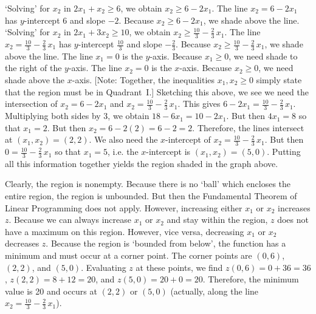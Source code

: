 \documentclass[11pt,letterpaper]{article}
\begin{document}
\sol `Solving' for $x_2$ in $2x_1 + x_2 \geq 6$, we obtain $x_2 \geq 6 - 2x_1$. The line $x_2= 6 - 2x_1$ has $y$-intercept 6 and slope $-2$. Because $x_2 \geq 6 - 2x_1$, we shade above the line. `Solving' for $x_2$ in $2x_1 + 3x_2 \geq 10$, we obtain $x_2 \geq \frac{10}{3} - \frac{2}{3}\,x_1$. The line $x_2= \frac{10}{3} - \frac{2}{3}\,x_1$ has $y$-intercept $\frac{10}{3}$ and slope $-\frac{2}{3}$. Because $x_2 \geq \frac{10}{3} - \frac{2}{3}\,x_1$, we shade above the line. The line $x_1= 0$ is the $y$-axis. Because $x_1 \geq 0$, we need shade to the right of the $y$-axis. The line $x_2= 0$ is the $x$-axis. Because $x_2 \geq 0$, we need shade above the $x$-axis. [Note: Together, the inequalities $x_1, x_2 \geq 0$ simply state that the region must be in Quadrant~I.] Sketching this above, we see we need the intersection of $x_2= 6 - 2x_1$ and $x_2= \frac{10}{3} - \frac{2}{3}\,x_1$. This gives $6 - 2x_1= \frac{10}{3} - \frac{2}{3}\,x_1$. Multiplying both sides by 3, we obtain $18 - 6x_1= 10 - 2x_1$. But then $4x_1= 8$ so that $x_1= 2$. But then $x_2= 6 - 2(2)= 6 - 2= 2$. Therefore, the lines intersect at $(x_1, x_2)= (2, 2)$. We also need the $x$-intercept of $x_2= \frac{10}{3} - \frac{2}{3}\,x_1$. But then $0= \frac{10}{3} - \frac{2}{3}\,x_1$ so that $x_1= 5$, i.e. the $x$-intercept is $(x_1, x_2)= (5, 0)$. Putting all this information together yields the region shaded in the graph above. \pspace

Clearly, the region is nonempty. Because there is no `ball' which encloses the entire region, the region is unbounded. But then the Fundamental Theorem of Linear Programming does not apply. However, increasing either $x_1$ or $x_2$ increases $z$. Because we can always increase $x_1$ or $x_2$ and stay within the region, $z$ does not have a maximum on this region. However, vice versa, decreasing $x_1$ or $x_2$ decreases $z$. Because the region is `bounded from below', the function has a minimum and must occur at a corner point. The corner points are $(0,6)$, $(2,2)$, and $(5,0)$. Evaluating $z$ at these points, we find $z(0,6)= 0 + 36= 36$, $z(2,2)= 8 + 12= 20$, and $z(5,0)= 20 + 0= 20$. Therefore, the minimum value is 20 and occurs at $(2, 2)$ or $(5,0)$ (actually, along the line $x_2= \frac{10}{3} - \frac{2}{3}\,x_1$). 
\end{document}
